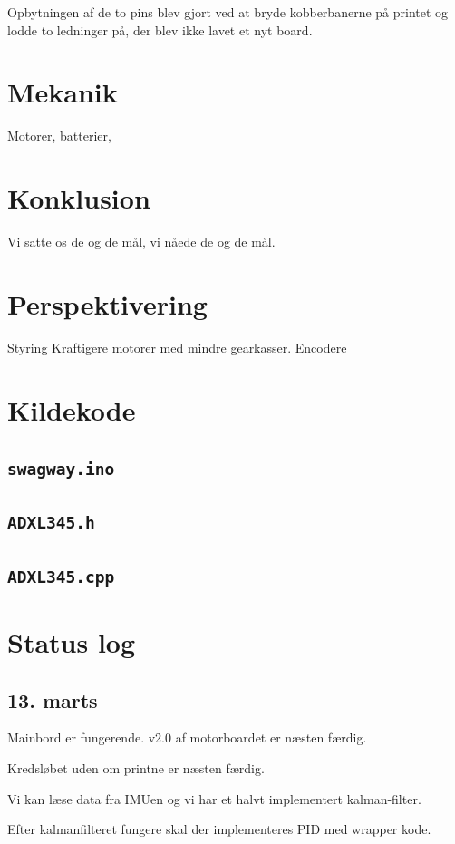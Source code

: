 \documentclass[a4paper,twoside,article,danish,table]{memoir}
\begin{document}
Opbytningen af de to pins blev gjort ved at bryde kobberbanerne på printet og lodde to ledninger på, der blev ikke lavet et nyt board.

\chapter{Mekanik}
Motorer, batterier, 
\chapter{Konklusion} \label{chap:kon}
Vi satte os de og de mål, vi nåede de og de mål.

\chapter{Perspektivering} \label{chap:per}
Styring
Kraftigere motorer med mindre gearkasser.
Encodere


\clearpage
\listoftables
\listoffigures
 
\clearpage \appendix

\chapter{Kildekode}

\section{\texttt{swagway.ino}}

\section{\texttt{ADXL345.h}}

\section{\texttt{ADXL345.cpp}}


\chapter{Status log}

\section{13. marts}
Mainbord er fungerende. v2.0 af motorboardet er næsten færdig.

Kredsløbet uden om printne er næsten færdig.

Vi kan læse data fra IMUen og vi har et halvt implementert kalman-filter.

Efter kalmanfilteret fungere skal der implementeres PID med wrapper kode.
\end{document}
